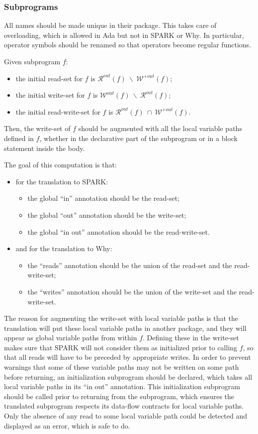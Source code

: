 \documentclass{article}
\newcommand{\outallwrites}[1]{\ensuremath{\mathcal{W}^{+out}(#1)}\xspace}
\newcommand{\outwrites}[1]{\ensuremath{\mathcal{W}^{out}(#1)}\xspace}
\newcommand{\outreads}[1]{\ensuremath{\mathcal{R}^{out}(#1)}\xspace}
\newcommand{\inter}{~\cap~}
\newcommand{\minus}{~\backslash~}
\begin{document}
\subsubsection{Subprograms}

All names should be made unique in their package. This takes care of
overloading, which is allowed in Ada but not in SPARK or Why. In particular,
operator symbols should be renamed so that operators become regular functions.

Given subprogram $f$:
\begin{itemize}
\item the initial read-set for $f$ is $\outreads{f} \minus \outallwrites{f}$;
\item the initial write-set for $f$ is $\outwrites{f} \minus \outreads{f}$;
\item the initial read-write-set for $f$ is $\outreads{f} \inter
  \outallwrites{f}$.
\end{itemize}

Then, the write-set of $f$ should be augmented with all the local variable paths
defined in $f$, whether in the declarative part of the subprogram or in a block
statement inside the body.

The goal of this computation is that:
\begin{itemize}
\item for the translation to SPARK:
\begin{itemize}
\item the global ``in'' annotation should be the read-set;
\item the global ``out'' annotation should be the write-set;
\item the global ``in out'' annotation should be the read-write-set.
\end{itemize}
\item and for the translation to Why:
\begin{itemize}
\item the ``reads'' annotation should be the union of the read-set and the
  read-write-set;
\item the ``writes'' annotation should be the union of the write-set and the
  read-write-set.
\end{itemize}
\end{itemize}

The reason for augmenting the write-set with local variable paths is that the
translation will put these local variable paths in another package, and they
will appear as global variable paths from within $f$. Defining these in the
write-set makes sure that SPARK will not consider them as initialized prior to
calling $f$, so that all reads will have to be preceded by appropriate
writes. In order to prevent warnings that some of these variable paths may not
be written on some path before returning, an initialization subprogram should
be declared, which takes all local variable paths in its ``in out''
annotation. This initialization subprogram should be called prior to returning
from the subprogram, which ensures the translated subprogram respects its
data-flow contracts for local variable paths. Only the absence of any read to
some local variable path could be detected and displayed as an error, which is
safe to do.
\end{document}
